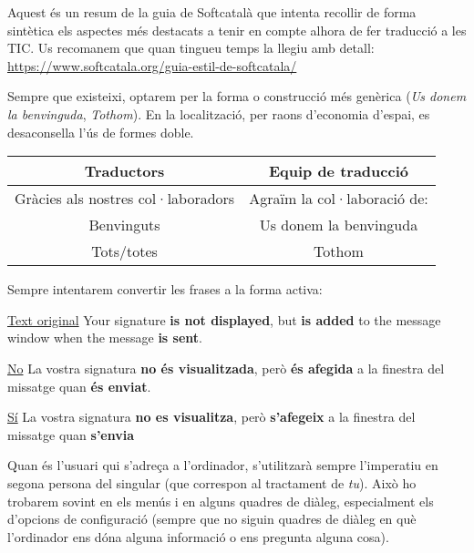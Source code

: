 \documentclass[9pt]{cheatsheet}
\begin{document}
Aquest és un resum de la guia de Softcatalà que intenta recollir de forma sintètica els aspectes més destacats a tenir en compte alhora de fer traducció a les TIC. Us recomanem que quan tingueu temps la llegiu amb detall: \url{https://www.softcatala.org/guia-estil-de-softcatala/}

\begin{multicols*}{3}



Sempre que existeixi, optarem per la forma o construcció més genèrica (\emph{Us donem la benvinguda}, \emph{Tothom}). En la localització, per raons d'economia d'espai, es desaconsella l'ús de formes doble.

\begin{tabular}{| c | c |}
 \hline
 Traductors & Equip de traducció \\
 \hline
 Gràcies als nostres col·laboradors & Agraïm la col·laboració de: \\
 \hline
 Benvinguts & Us donem la benvinguda \\
 \hline
 Tots/totes & Tothom \\
 \hline
\end{tabular}


Sempre intentarem convertir les frases a la forma activa:

\underline {Text original} Your signature \textbf{is not displayed}, but \textbf{is added} to the message window when the message \textbf{is sent}.

\underline {No} La vostra signatura \textbf{no és visualitzada}, però \textbf{és afegida} a la finestra del missatge quan \textbf{és enviat}.

\underline {Sí} La vostra signatura \textbf{no es visualitza}, però \textbf{s'afegeix} a la finestra del missatge quan \textbf{s'envia}



Quan és l'usuari qui s'adreça a l'ordinador, s'utilitzarà sempre l'imperatiu en segona persona del singular (que correspon al tractament de \emph{tu}). Això ho trobarem sovint en els menús i en alguns quadres de diàleg, especialment els d'opcions de configuració (sempre que no siguin quadres de diàleg en què l'ordinador ens dóna alguna informació o ens pregunta alguna cosa).


\end{multicols*}
\end{document}
